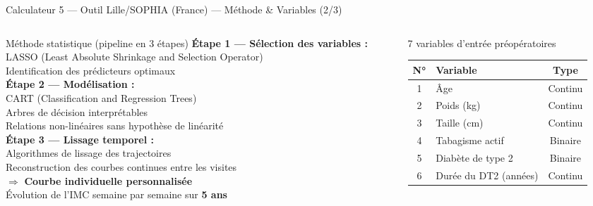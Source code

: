 \documentclass[aspectratio=169]{beamer}
\begin{document}
\begin{frame}{Calculateur 5 --- Outil Lille/SOPHIA (France) --- Méthode \& Variables (2/3)}
  \begin{columns}[T]
    \begin{column}{0.50\textwidth}
      \begin{block}{Méthode statistique (pipeline en 3 étapes)}
        \footnotesize
        \textbf{Étape 1 --- Sélection des variables :}\\
        LASSO (Least Absolute Shrinkage and Selection Operator)\\
        Identification des prédicteurs optimaux\\[6pt]
        \textbf{Étape 2 --- Modélisation :}\\
        CART (Classification and Regression Trees)\\
        Arbres de décision interprétables\\
        Relations non-linéaires sans hypothèse de linéarité\\[6pt]
        \textbf{Étape 3 --- Lissage temporel :}\\
        Algorithmes de lissage des trajectoires\\
        Reconstruction des courbes continues entre les visites\\[6pt]
        $\Rightarrow$ \textcolor{vertdoux}{\textbf{Courbe individuelle personnalisée}}\\
        Évolution de l'IMC semaine par semaine sur \textbf{5 ans}
      \end{block}
    \end{column}
    \begin{column}{0.47\textwidth}
      \begin{block}{7 variables d'entrée préopératoires}
        \footnotesize
        \begin{tabular}{clc}
          \toprule
          \textbf{N°} & \textbf{Variable} & \textbf{Type} \\
          \midrule
          1 & Âge                   & Continu \\
          2 & Poids (kg)            & Continu \\
          3 & Taille (cm)           & Continu \\
          4 & Tabagisme actif       & Binaire \\
          5 & Diabète de type 2     & Binaire \\
          6 & Durée du DT2 (années) & Continu \\

\end{tabular}
\end{block}
\end{column}
\end{columns}
\end{frame}
\end{document}
